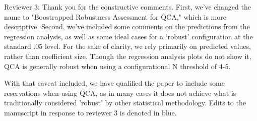 \documentclass[12pt,stdletter,dateno,sigleft]{newlfm} %
\begin{document}
\begin{newlfm}
Reviewer 3: Thank you for the constructive comments. First, we've changed the name to "Boostrapped Robustness Assessment for QCA," which is more descriptive. Second, we've included some comments on the predictions from the regression analysis, as well as some ideal cases for a `robust' configuration at the standard .05 level. For the sake of clarity, we rely primarily on predicted values, rather than coefficient size. Though the regression analysis plots do not show it, QCA is generally robust when using a configurational N threshold of 4-5. 

With that caveat included, we have qualified the paper to include some reservations when using QCA, as in many cases it does not achieve what is traditionally considered 'robust' by other statistical methodology. Edits to the manuscript in response to reviewer 3 is denoted in blue. \newline



\end{newlfm}
\end{document}
